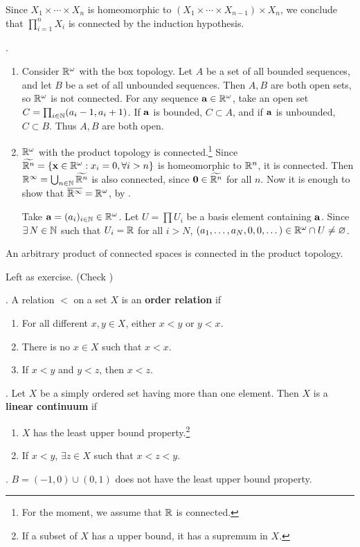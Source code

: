 Since \(X_1 \times \cdots \times X_n\) is homeomorphic to \((X_1 \times \cdots \times X_{n-1}) \times X_n\), we conclude that \(\prod_{i=1}^n X_i\) is connected by the induction hypothesis.

\ex.
\begin{enumerate}
    \item Consider \(\R^\omega\) with the box topology. Let \(A\) be a set of all bounded sequences, and let \(B\) be a set of all unbounded sequences. Then \(A, B\) are both open sets, so \(\R^\omega\) is not connected. For any sequence \(\bf{a} \in \R^\omega\), take an open set \(C = \prod_{i \in \N} (a_i - 1, a_i + 1)\). If \(\bf{a}\) is bounded, \(C \subset A\), and if \(\bf{a}\) is unbounded, \(C \subset B\). Thus \(A, B\) are both open.
    \item \(\R^\omega\) with the product topology is connected.\footnote{For the moment, we assume that \(\R\) is connected.} Since \(\widetilde{\R^n} = \{\bf{x} \in \R^\omega : x_i = 0, \forall i > n\}\) is homeomorphic to \(\R^n\), it is connected. Then \(\R^\infty = \bigcup_{n \in \N} \widetilde{\R^n}\) is also connected, since \(\bf{0} \in \widetilde{\R^n}\) for all \(n\). Now it is enough to show that \(\cl{\R^\infty} = \R^\omega\), by .

          Take \(\bf{a} = (a_i)_{i \in \N} \in \R^\omega\). Let \(U = \prod U_i\) be a basis element containing \(\bf{a}\). Since \(\exists N \in \N\) such that \(U_i = \R\) for all \(i > N\), \((a_1, \dots, a_N, 0, 0, \dots) \in \R^\omega \cap U \neq \varnothing\).
\end{enumerate}

\rmk An arbitrary product of connected spaces is connected in the product topology.

\pf Left as exercise. (Check )

\pagebreak


.  A relation \(<\) on a set \(X\) is an \textbf{order relation} if
\begin{enumerate}
    \item {} For all different \(x, y \in X\), either \(x < y\) or \(y < x\).
    \item {} There is no \(x \in X\) such that \(x < x\).
    \item {} If \(x < y\) and \(y < z\), then \(x < z\).
\end{enumerate}

.  Let \(X\) be a simply ordered set having more than one element. Then \(X\) is a \textbf{linear continuum} if
\begin{enumerate}
    \item \(X\) has the least upper bound property.\footnote{If a subset of \(X\) has a upper bound, it has a supremum in \(X\).}
    \item If \(x < y\), \(\exists z \in X\) such that \(x < z < y\).
\end{enumerate}

\ex. \(B = (-1, 0) \cup (0, 1)\) does not have the least upper bound property.

\pagebreak
